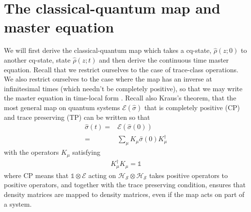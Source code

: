 \documentclass[aps,pra,showpacs,citeautoscript,amsmath,amssymb,floatfix,superscriptaddress,bbm, verbatim,amsfonts,changes,11pt,nofootinbib,longbibliography]{revtex4-2}
\newcommand{\id}{\mathbb{1}}
\def\z{{z}}
\renewcommand{\varrho}{\hat{\rho}}
\def\cqstate{\varrho}
\def\psizt{{\varrho(\z;t)}}
\def\t0{0}
\begin{document}
\section{The classical-quantum map and master equation}
\label{sec:cq-dynamics}

We will first derive the classical-quantum map which takes a cq-state, $\cqstate(\z;\t0)$ to another cq-state, state $\psizt$ and then derive the continuous time master equation. Recall that we restrict ourselves to the case of trace-class operations. We also restrict ourselves to the case where the map has an inverse at infinitesimal times (which needn't be completely positive), so that we may write the master equation in time-local form \cite{time-local}. %
Recall also Kraus's theorem, that the most general map on quantum systems $\mathcal{E}(\hat{\sigma})$ that is completely positive (CP) and trace preserving (TP) can be written so that
\begin{align}
\hat{\sigma}(t)=&\mathcal{E}(\hat{\sigma}(0))\nonumber\\
=&\sum_\mu K_\mu \hat{\sigma}(0) K^\dagger_\mu
\label{eq:kraus}
\end{align}
with the operators $K_\mu$ satisfying
\begin{align}
K_\mu^\dagger K_\mu=\id
\end{align}
where CP means that 
$\id\otimes\mathcal{E}$ acting on $\mathcal{H_S}\otimes\mathcal{H_S}$ takes positive operators to positive operators, and together with the trace preserving condition, ensures that density matrices are mapped to density matrices, even if the map acts on part of a system. 
\end{document}
